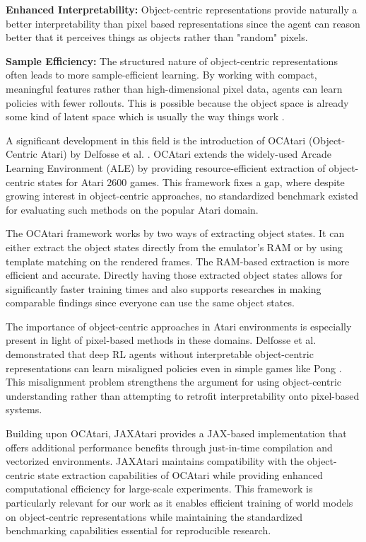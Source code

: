 \documentclass[
	english,
	ruledheaders=section,
	class=report,
	thesis={type=master},
	accentcolor=9c,
	custommargins=true,
	marginpar=false,
	parskip=half-,
	fontsize=11pt,
]{tudapub}
\begin{document}
\textbf{Enhanced Interpretability:} Object-centric representations provide naturally a better interpretability than pixel based representations since the agent can reason better that it perceives things as objects rather than "random" pixels.

\textbf{Sample Efficiency:} The structured nature of object-centric representations often leads to more sample-efficient learning. By working with compact, meaningful features rather than high-dimensional
pixel data, agents can learn policies with fewer rollouts. This is possible because the object space is already some kind of latent space which is usually the way things work \cite{locatello2020object}.

A significant development in this field is the introduction of OCAtari
(Object-Centric Atari) by Delfosse et al. \cite{delfosse2023ocatari}. OCAtari
extends the widely-used Arcade Learning Environment (ALE) by providing
resource-efficient extraction of object-centric states for Atari 2600 games.
This framework fixes a gap, where despite growing interest in object-centric
approaches, no standardized benchmark existed for evaluating such methods on
the popular Atari domain.

The OCAtari framework works by two ways of extracting object states. It can
either extract the object states directly from the emulator's RAM or by using
template matching on the rendered frames. The RAM-based extraction is more
efficient and accurate. Directly having those extracted object states allows
for significantly faster training times and also supports researches in making
comparable findings since everyone can use the same object states.

The importance of object-centric approaches in Atari environments is especially
present in light of pixel-based methods in these domains. Delfosse et al.
demonstrated that deep RL agents without interpretable object-centric
representations can learn misaligned policies even in simple games like Pong
\cite{delfosse2023ocatari}. This misalignment problem strengthens the argument
for using object-centric understanding rather than attempting to retrofit
interpretability onto pixel-based systems.

Building upon OCAtari, JAXAtari \cite{machado2023revisiting} provides a
JAX-based implementation that offers additional performance benefits through
just-in-time compilation and vectorized environments. JAXAtari maintains
compatibility with the object-centric state extraction capabilities of OCAtari
while providing enhanced computational efficiency for large-scale experiments.
This framework is particularly relevant for our work as it enables efficient
training of world models on object-centric representations while maintaining
the standardized benchmarking capabilities essential for reproducible research.
\end{document}
